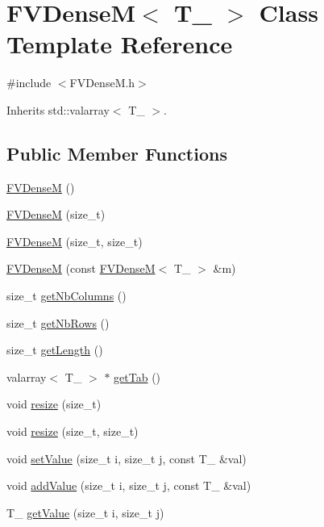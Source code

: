 \hypertarget{classFVDenseM}{
\section{FVDenseM$<$ T\_\- $>$ Class Template Reference}
\label{d9/d70/classFVDenseM}
}


{\ttfamily \#include $<$FVDenseM.h$>$}



Inherits std::valarray$<$ T\_\- $>$.

\subsection*{Public Member Functions}
\begin{DoxyCompactItemize}
\item 
\hyperlink{classFVDenseM_a25efab40ef300eacf4dbd47a82003815}{FVDenseM} ()
\item 
\hyperlink{classFVDenseM_afd48d1a71dff37f7db7d80498ec03ca9}{FVDenseM} (size\_\-t)
\item 
\hyperlink{classFVDenseM_a4bf12caa0a80a5c306ee657a28495d98}{FVDenseM} (size\_\-t, size\_\-t)
\item 
\hyperlink{classFVDenseM_a037dca58df177174020439a0ab894017}{FVDenseM} (const \hyperlink{classFVDenseM}{FVDenseM}$<$ T\_\- $>$ \&m)
\item 
size\_\-t \hyperlink{classFVDenseM_ae66137e8cb36be98d9d2bd139d4ac021}{getNbColumns} ()
\item 
size\_\-t \hyperlink{classFVDenseM_a33f9a9828a0dd36b3aac2b519e621247}{getNbRows} ()
\item 
size\_\-t \hyperlink{classFVDenseM_a600073d563962412f8873bb598d52be7}{getLength} ()
\item 
valarray$<$ T\_\- $>$ $\ast$ \hyperlink{classFVDenseM_a93316ed69f9b46547cf3eaae0fec77a6}{getTab} ()
\item 
void \hyperlink{classFVDenseM_a572d8018b3c8e381d4a8c924bfae3bc6}{resize} (size\_\-t)
\item 
void \hyperlink{classFVDenseM_aa4d3517d2f731ae2943983293a5b1103}{resize} (size\_\-t, size\_\-t)
\item 
void \hyperlink{classFVDenseM_a5145b2a41ccf168751d1dd9972859e32}{setValue} (size\_\-t i, size\_\-t j, const T\_\- \&val)
\item 
void \hyperlink{classFVDenseM_a53fdc14c5ce8e45b80846954c3cc0fbb}{addValue} (size\_\-t i, size\_\-t j, const T\_\- \&val)
\item 
T\_\- \hyperlink{classFVDenseM_a89d9927485d8a33c508e8caf871ca117}{getValue} (size\_\-t i, size\_\-t j)

\end{DoxyCompactItemize}
